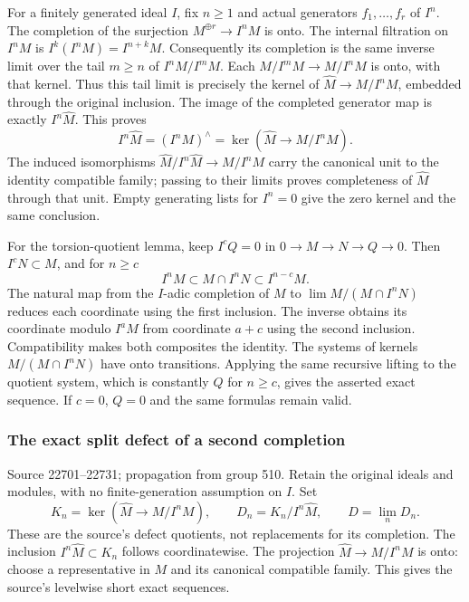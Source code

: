 For a finitely generated ideal \(I\), fix \(n\geq1\) and actual generators \(f_1,\ldots,f_r\) of \(I^n\). The completion of the surjection \(M^{\oplus r}\to I^nM\) is onto. The internal filtration on \(I^nM\) is \(I^k(I^nM)=I^{n+k}M\). Consequently its completion is the same inverse limit over the tail \(m\geq n\) of \(I^nM/I^mM\). Each \(M/I^mM\to M/I^nM\) is onto, with that kernel. Thus this tail limit is precisely the kernel of \(\widehat M\to M/I^nM\), embedded through the original inclusion. The image of the completed generator map is exactly \(I^n\widehat M\). This proves \[
I^n\widehat M=(I^nM)^\wedge
 =\ker(\widehat M\to M/I^nM).
\] The induced isomorphisms \(\widehat M/I^n\widehat M\to M/I^nM\) carry the canonical unit to the identity compatible family; passing to their limits proves completeness of \(\widehat M\) through that unit. Empty generating lists for \(I^n=0\) give the zero kernel and the same conclusion.

For the torsion-quotient lemma, keep \(I^cQ=0\) in \(0\to M\to N\to Q\to0\). Then \(I^cN\subset M\), and for \(n\geq c\) \[
I^nM\subset M\cap I^nN\subset I^{n-c}M.
\] The natural map from the \(I\)-adic completion of \(M\) to \(\lim M/(M\cap I^nN)\) reduces each coordinate using the first inclusion. The inverse obtains its coordinate modulo \(I^aM\) from coordinate \(a+c\) using the second inclusion. Compatibility makes both composites the identity. The systems of kernels \(M/(M\cap I^nN)\) have onto transitions. Applying the same recursive lifting to the quotient system, which is constantly \(Q\) for \(n\geq c\), gives the asserted exact sequence. If \(c=0\), \(Q=0\) and the same formulas remain valid.

\subsubsection{The exact split defect of a second completion}\label{algebra-proof-014-the-exact-split-defect-of-a-second-completion}

Source 22701--22731; propagation from group 510. Retain the original ideals and modules, with no finite-generation assumption on \(I\). Set \[
K_n=\ker(\widehat M\to M/I^nM),\qquad
D_n=K_n/I^n\widehat M,\qquad D=\lim_nD_n .
\] These are the source's defect quotients, not replacements for its completion. The inclusion \(I^n\widehat M\subset K_n\) follows coordinatewise. The projection \(\widehat M\to M/I^nM\) is onto: choose a representative in \(M\) and its canonical compatible family. This gives the source's levelwise short exact sequences.

